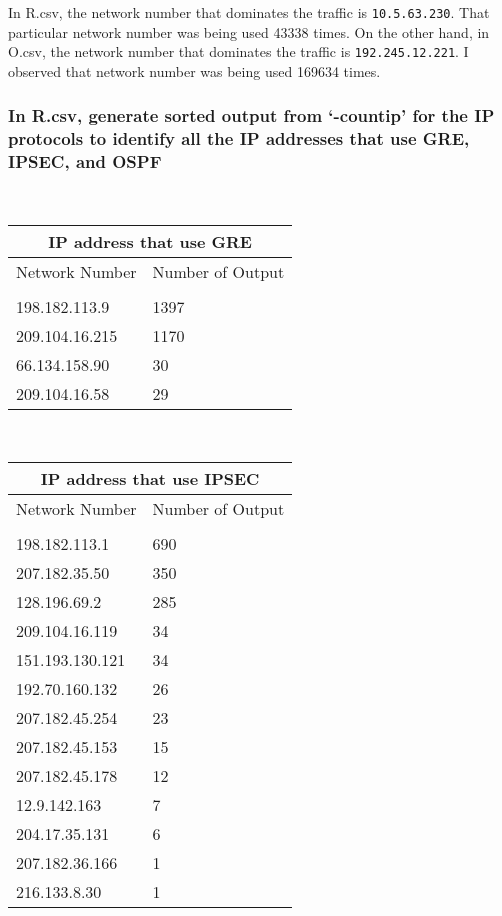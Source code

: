 \documentclass[letterpaper,10pt,titlepage,draftclsnofoot,onecolumn]{IEEEtran}
\begin{document}
In R.csv, the network number that dominates the traffic is \verb|10.5.63.230|. 
That particular network number was being used 43338 times.
On the other hand, in O.csv, the network number that dominates the traffic is \verb|192.245.12.221|. 
I observed that network number was being used 169634 times.
\hfill\\
\subsubsection{In R.csv, generate sorted output from ‘-countip’ for the IP protocols to identify all the IP addresses that use GRE, IPSEC, and OSPF}

\hfill\\

\begin{tabular}{ |p{3cm}||p{3cm}|  }
 \hline
 \multicolumn{2}{|c|}{IP address that use GRE} \\
 \hline
 Network Number & Number of Output\\
 \hline 
 &\\
 198.182.113.9  & 1397\\
 209.104.16.215 & 1170\\
 66.134.158.90  & 30\\
 209.104.16.58  & 29\\
 \hline
\end{tabular}

\hfill\\

\begin{tabular}{ |p{3cm}||p{3cm}|  }
 \hline
 \multicolumn{2}{|c|}{IP address that use IPSEC} \\
 \hline
 Network Number & Number of Output\\
 \hline 
 &\\
198.182.113.1  & 690\\
207.182.35.50 & 350\\
128.196.69.2 & 285\\
209.104.16.119 & 34\\
151.193.130.121 & 34\\
192.70.160.132 & 26\\
207.182.45.254 & 23\\
207.182.45.153 & 15\\
207.182.45.178 & 12\\
12.9.142.163 & 7\\
204.17.35.131 & 6\\
207.182.36.166 & 1\\
216.133.8.30 & 1\\
 \hline
\end{tabular}
\end{document}
